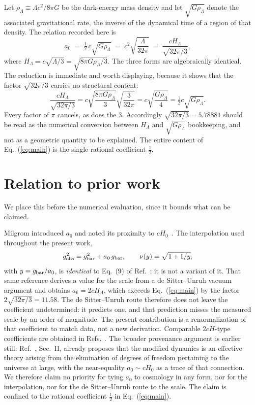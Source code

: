 \documentclass[11pt]{article}
\begin{document}
Let $\rho_\Lambda \equiv \Lambda c^2/8\pi G$ be the dark-energy mass density and let
$\sqrt{G\rho_\Lambda}$ denote the associated gravitational rate, the inverse of the dynamical time of a
region of that density. The relation recorded here is
\begin{equation}
a_0 \;=\; \tfrac{1}{2}\,c\sqrt{G\rho_\Lambda}
      \;=\; c^{2}\sqrt{\frac{\Lambda}{32\pi}}
      \;=\; \frac{cH_\Lambda}{\sqrt{32\pi/3}} ,
\label{eq:main}
\end{equation}
where $H_\Lambda = c\sqrt{\Lambda/3} = \sqrt{8\pi G\rho_\Lambda/3}$. The three forms are algebraically
identical. The reduction is immediate and worth displaying, because it shows that the factor
$\sqrt{32\pi/3}$ carries no structural content:
\begin{equation}
\frac{cH_\Lambda}{\sqrt{32\pi/3}}
= c\sqrt{\frac{8\pi G\rho_\Lambda}{3}}\sqrt{\frac{3}{32\pi}}
= c\sqrt{\frac{G\rho_\Lambda}{4}}
= \tfrac12 c\sqrt{G\rho_\Lambda}.
\label{eq:reduce}
\end{equation}
Every factor of $\pi$ cancels, as does the $3$. Accordingly $\sqrt{32\pi/3}=5.78881$ should be read as
the numerical conversion between $H_\Lambda$ and $\sqrt{G\rho_\Lambda}$ bookkeeping, and not as a
geometric quantity to be explained. The entire content of Eq.~(\ref{eq:main}) is the single rational
coefficient $\tfrac12$.

\section{Relation to prior work}

We place this before the numerical evaluation, since it bounds what can be claimed.

Milgrom introduced $a_0$ and noted its proximity to $cH_0$~\cite{Milgrom1983}. The interpolation used
throughout the present work,
\begin{equation}
g_{\rm obs}^2 = g_{\rm bar}^2 + a_0\,g_{\rm bar},
\qquad
\nu(y) = \sqrt{1+1/y},
\label{eq:closure}
\end{equation}
with $y = g_{\rm bar}/a_0$, is \emph{identical} to Eq.~(9) of Ref.~\cite{Milgrom1999}; it is not a
variant of it. That same reference derives a value for the scale from a de Sitter--Unruh vacuum
argument and obtains $a_0 = 2cH_\Lambda$, which exceeds Eq.~(\ref{eq:main}) by the factor
$2\sqrt{32\pi/3} = 11.58$. The de Sitter--Unruh route therefore does not leave the coefficient
undetermined: it predicts one, and that prediction misses the measured scale by an order of magnitude.
The present contribution is a renormalization of that coefficient to match data, not a new derivation.
Comparable $2cH$-type coefficients are obtained in Refs.~\cite{Pikhitsa2010,Klinkhamer2011}.
The broader provenance argument is earlier still: Ref.~\cite{Milgrom1994}, Sec.~II, already proposes that
the modified dynamics is an effective theory arising from the elimination of degrees of freedom pertaining
to the universe at large, with the near-equality $a_0\sim cH_0$ as a trace of that connection. We therefore
claim no priority for tying $a_0$ to cosmology in any form, nor for the interpolation, nor for the de
Sitter--Unruh route to the scale. The claim is confined to the rational coefficient $\tfrac12$ in
Eq.~(\ref{eq:main}).
\end{document}

